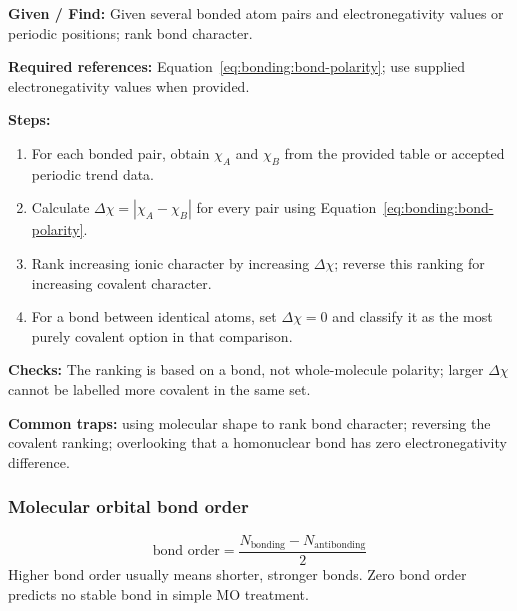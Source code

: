 \textbf{Given / Find:} Given several bonded atom pairs and electronegativity values or periodic positions; rank bond character.

\textbf{Required references:} Equation~\eqref{eq:bonding:bond-polarity}; use supplied electronegativity values when provided.

\textbf{Steps:}
\begin{enumerate}
    \item For each bonded pair, obtain \(\chi_A\) and \(\chi_B\) from the provided table or accepted periodic trend data.
    \item Calculate \(\Delta\chi=|\chi_A-\chi_B|\) for every pair using Equation~\eqref{eq:bonding:bond-polarity}.
    \item Rank increasing ionic character by increasing \(\Delta\chi\); reverse this ranking for increasing covalent character.
    \item For a bond between identical atoms, set \(\Delta\chi=0\) and classify it as the most purely covalent option in that comparison.
\end{enumerate}

\textbf{Checks:} The ranking is based on a bond, not whole-molecule polarity; larger \(\Delta\chi\) cannot be labelled more covalent in the same set.

\textbf{Common traps:} using molecular shape to rank bond character; reversing the covalent ranking; overlooking that a homonuclear bond has zero electronegativity difference.

\subsubsection{Molecular orbital bond order}
\begin{equation}
\label{eq:bonding:mo-bond-order}
\text{bond order}=\frac{N_{\mathrm{bonding}}-N_{\mathrm{antibonding}}}{2}
\end{equation}
Higher bond order usually means shorter, stronger bonds. Zero bond order predicts no stable bond in simple MO treatment.
